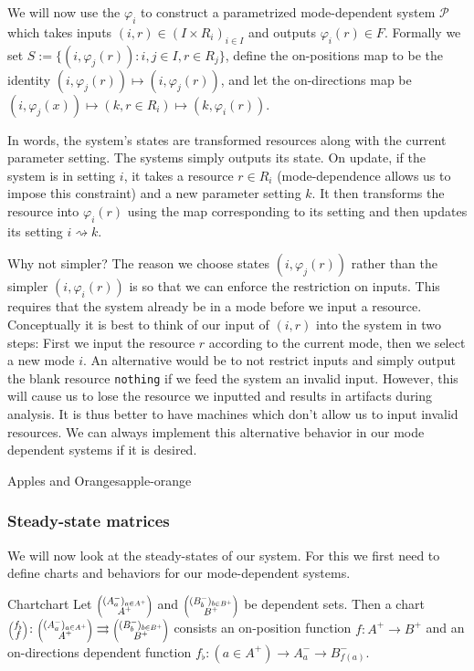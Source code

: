 \documentclass[12pt, a4paper]{article}
\theoremstyle{definition}
\theoremstyle{plain}
\theoremstyle{plain}
\theoremstyle{plain}
\theoremstyle{plain}
\theoremstyle{plain}
\theoremstyle{remark}
\theoremstyle{remark}
\newcommand{\mc}[1]{\mathcal{#1}}
\newcommand{\lens}[2]{\scaleobj{0.6}{\begin{pmatrix} \scaleobj{1.3}{{#1}} \\ \scaleobj{1.3}{{#2}} \end{pmatrix}}}
\begin{document}
We will now use the $\varphi_i$ to construct a parametrized mode-dependent system $\mc{P}$ which takes inputs $(i, r) \in (I \times R_i)_{i \in I}$ and outputs $\varphi_i(r) \in F$. Formally we set $S := \{ (i,\varphi_j(r)) : i,j \in I, r \in R_j \}$, define the on-positions map to be the identity $(i,\varphi_j(r)) \mapsto (i,\varphi_j(r))$, and let the on-directions map be $(i,\varphi_j(x))\mapsto (k,r \in R_i) \mapsto (k,\varphi_i(r))$. 

In words, the system's states are transformed resources along with the current parameter setting. The systems simply outputs its state. On update, if the system is in setting $i$, it takes a resource $r \in R_i$ (mode-dependence allows us to impose this constraint) and a new parameter setting $k$. It then transforms the resource into $\varphi_i(r)$ using the map corresponding to its setting and then updates its setting $i \rightsquigarrow k$.

\begin{tcremark}{Why not simpler?}{}
	The reason we choose states $(i,\varphi_j(r))$ rather than the simpler $(i,\varphi_i(r))$ is so that we can enforce the restriction on inputs. This requires that the system already be in a mode before we input a resource. Conceptually it is best to think of our input of $(i,r)$ into the system in two steps: First we input the resource $r$ according to the current mode, then we select a new mode $i$. An alternative would be to not restrict inputs and simply output the blank resource \texttt{nothing} if we feed the system an invalid input. However, this will cause us to lose the resource we inputted and results in artifacts during analysis. It is thus better to have machines which don't allow us to input invalid resources. We can always implement this alternative behavior in our mode dependent systems if it is desired.
\end{tcremark}

\begin{tcexample}{Apples and Oranges}{apple-orange}

\end{tcexample}

\subsubsection{Steady-state matrices}
We will now look at the steady-states of our system. For this we first need to define charts and behaviors for our mode-dependent systems.

\begin{tcdefinition}{Chart}{chart}
	Let $\lens{(A^-_a)_{a \in A^+}}{A^+}$ and $\lens{(B^-_b)_{b \in B^+}}{B^+}$ be dependent sets. Then a chart $\lens{f_\flat}{f} \colon \lens{(A^-_a)_{a \in A^+}}{A^+} \rightrightarrows \lens{(B^-_b)_{b \in B^+}}{B^+}$ consists an on-position function $f \colon A^+ \rightarrow B^+$ and an on-directions dependent function $f_\flat \colon (a \in A^+) \rightarrow A^-_a \rightarrow B^-_{f(a)}$.
\end{tcdefinition}
\end{document}

